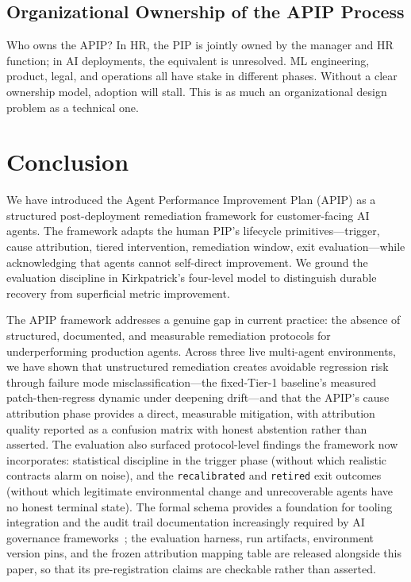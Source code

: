 \documentclass[conference]{IEEEtran}
\begin{document}
\subsection{Organizational Ownership of the APIP Process}
\label{subsec:ownership}

Who owns the APIP? In HR, the PIP is jointly owned by the manager and HR
function; in AI deployments, the equivalent is unresolved. ML engineering,
product, legal, and operations all have stake in different phases. Without a
clear ownership model, adoption will stall. This is as much an organizational
design problem as a technical one.
\section{Conclusion}
\label{sec:conclusion}

We have introduced the Agent Performance Improvement Plan (APIP) as a
structured post-deployment remediation framework for customer-facing AI agents.
The framework adapts the human PIP's lifecycle primitives---trigger, cause
attribution, tiered intervention, remediation window, exit evaluation---while
acknowledging that agents cannot self-direct improvement. We ground the
evaluation discipline in Kirkpatrick's four-level model to distinguish durable
recovery from superficial metric improvement.

The APIP framework addresses a genuine gap in current practice: the absence of
structured, documented, and measurable remediation protocols for
underperforming production agents. Across three live multi-agent
environments, we have shown that unstructured remediation creates avoidable
regression risk through failure mode misclassification---the fixed-Tier-1
baseline's measured patch-then-regress dynamic under deepening drift---and
that the APIP's cause attribution phase provides a direct, measurable
mitigation, with attribution quality reported as a confusion matrix with
honest abstention rather than asserted. The evaluation also surfaced
protocol-level findings the framework now incorporates: statistical
discipline in the trigger phase (without which realistic contracts alarm on
noise), and the \texttt{recalibrated} and \texttt{retired} exit outcomes
(without which legitimate environmental change and unrecoverable agents have
no honest terminal state). The formal schema provides a foundation for
tooling integration and the audit trail documentation increasingly required by
AI governance frameworks~\cite{brundage2020trustworthy,eu2024aiact,wachter2017counterfactual};
the evaluation harness, run artifacts, environment version pins, and the
frozen attribution mapping table are released alongside this paper, so that
its pre-registration claims are checkable rather than asserted.
\end{document}
